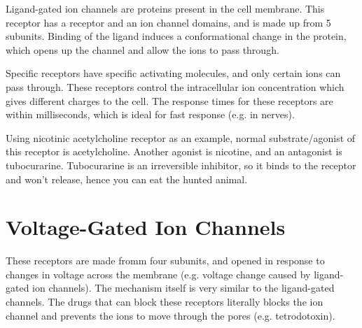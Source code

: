 \begin{center}
\end{center}

Ligand-gated ion channels are proteins present in the cell membrane.
This receptor has a receptor and an ion channel domains, and is made up from 5 subunits.
Binding of the ligand induces a conformational change in the protein, which opens up the channel and allow the ions to pass through.

Specific receptors have specific activating molecules, and only certain ions can pass through.
These receptors control the intracellular ion concentration which gives different charges to the cell.
The response times for these receptors are within milliseconds, which is ideal for fast response (e.g. in nerves).

Using nicotinic acetylcholine receptor as an example, normal substrate/agonist of this receptor is acetylcholine.
Another agonist is nicotine, and an antagonist is tubocurarine.
Tubocurarine is an irreversible inhibitor, so it binds to the receptor and won't release, hence you can eat the hunted animal.

\section{Voltage-Gated Ion Channels}

\begin{center}
\end{center}

These receptors are made fromm four subunits, and opened in response to changes in voltage across the membrane (e.g. voltage change caused by ligand-gated ion channels).
The mechanism itself is very similar to the ligand-gated channels.
The drugs that can block these receptors literally blocks the ion channel and prevents the ions to move through the pores (e.g. tetrodotoxin).












